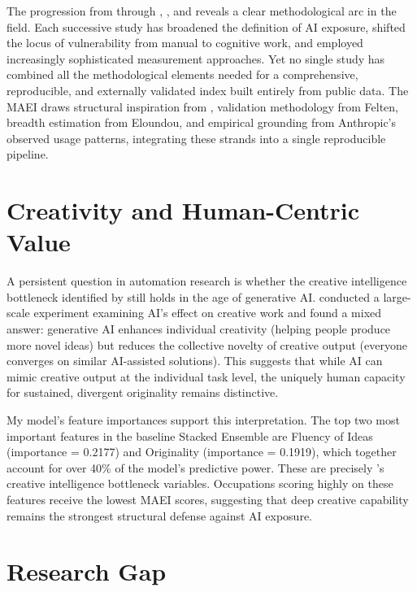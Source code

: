 The progression from \citet{Frey_Osborne_2017} through \citet{Felten_Raj_Seamans_2021}, \citet{Eloundou_Manning_2023}, and \citet{Anthropic_2026} reveals a clear methodological arc in the field. Each successive study has broadened the definition of AI exposure, shifted the locus of vulnerability from manual to cognitive work, and employed increasingly sophisticated measurement approaches. Yet no single study has combined all the methodological elements needed for a comprehensive, reproducible, and externally validated index built entirely from public data. The MAEI draws structural inspiration from \citet{Frey_Osborne_2017}, validation methodology from Felten, breadth estimation from Eloundou, and empirical grounding from Anthropic's observed usage patterns, integrating these strands into a single reproducible pipeline.

\section{Creativity and Human-Centric Value}
\label{sec:creativity}

A persistent question in automation research is whether the creative intelligence bottleneck identified by \citet{Frey_Osborne_2017} still holds in the age of generative AI. \citet{Doshi_Hauser_2024} conducted a large-scale experiment examining AI's effect on creative work and found a mixed answer: generative AI enhances individual creativity (helping people produce more novel ideas) but reduces the collective novelty of creative output (everyone converges on similar AI-assisted solutions). This suggests that while AI can mimic creative output at the individual task level, the uniquely human capacity for sustained, divergent originality remains distinctive.

My model's feature importances support this interpretation. The top two most important features in the baseline Stacked Ensemble are Fluency of Ideas (importance = 0.2177) and Originality (importance = 0.1919), which together account for over 40\% of the model's predictive power. These are precisely \citet{Frey_Osborne_2017}'s creative intelligence bottleneck variables. Occupations scoring highly on these features receive the lowest MAEI scores, suggesting that deep creative capability remains the strongest structural defense against AI exposure.

\section{Research Gap}
\label{sec:research-gap}

